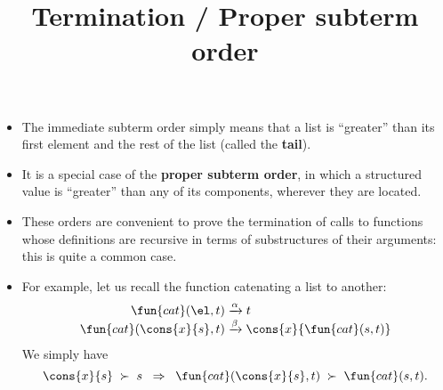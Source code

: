 \documentclass[wide]{slides}
\begin{document}
\begin{slide}
  \title{Termination / Proper subterm order}

  \begin{itemize}

    \item The immediate subterm order simply means that a list is
      ``greater'' than its first element and the rest of the list
      (called the \textbf{tail}).

    \item It is a special case of the \textbf{proper subterm order},
      in which a structured value is ``greater'' than any of its
      components, wherever they are located.

    \item These orders are convenient to prove the termination of
      calls to functions whose definitions are recursive in terms of
      substructures of their arguments: this is quite a common case.

    \item For example, let us recall the function catenating a list to
      another:
      \begin{align*}
        \fun{cat}(        \el,t) &\xrightarrow{\alpha} t\\
        \fun{cat}(\cons{x}{s},t) &\xrightarrow{\smash{\beta}}
        \cons{x}{\fun{cat}(s,t)}
      \end{align*}
      We simply have
      \begin{equation*}
        \cons{x}{s} \; \succ \; s \;\; \Rightarrow \;\;
        \fun{cat}(\cons{x}{s},t) \; \succ \;
        \fun{cat}(s,t).
      \end{equation*}

  \end{itemize}

\end{slide}
\end{document}
